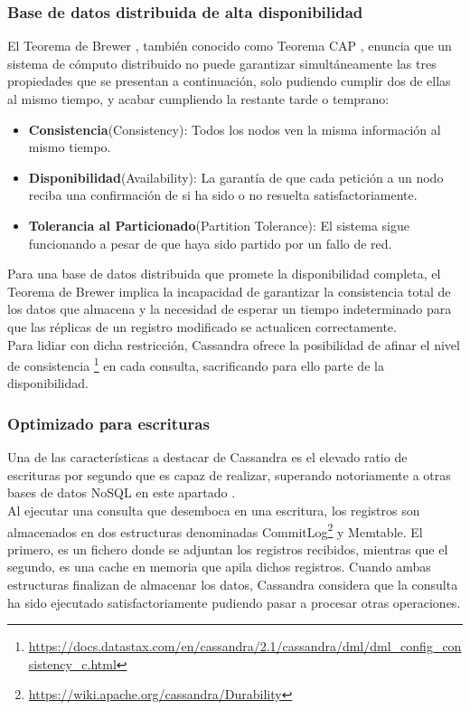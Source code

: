 \subsubsection{Base de datos distribuida de alta disponibilidad}

El Teorema de Brewer \cite{gilbert2002brewer}, también conocido como Teorema CAP , enuncia que un sistema de cómputo distribuido no puede  garantizar simultáneamente las tres propiedades que se presentan a continuación, solo pudiendo cumplir dos de ellas al mismo tiempo, y acabar cumpliendo la restante tarde o temprano:

\begin{itemize}
	\item \textbf{Consistencia}(Consistency): Todos los nodos ven la misma información al mismo tiempo.
	\item \textbf{Disponibilidad}(Availability): La garantía de que cada petición a un nodo reciba una confirmación de si ha sido o no resuelta satisfactoriamente.
	\item \textbf{Tolerancia al Particionado}(Partition Tolerance): El sistema sigue funcionando a pesar de que haya sido partido por un fallo de red.
\end{itemize}

Para una base de datos distribuida que promete la disponibilidad completa, el Teorema de Brewer implica la incapacidad de garantizar la consistencia total de los datos que almacena y la necesidad de esperar un tiempo indeterminado para que las réplicas de un registro modificado se actualicen correctamente.\\

Para lidiar con dicha restricción, Cassandra ofrece la posibilidad de afinar el nivel de consistencia \footnote{\url{https://docs.datastax.com/en/cassandra/2.1/cassandra/dml/dml_config_consistency_c.html}} en cada consulta, sacrificando para ello parte de la disponibilidad.

\subsubsection{Optimizado para escrituras}

Una de las características a destacar de Cassandra es el elevado ratio de escrituras por segundo que es capaz de realizar, superando notoriamente a otras bases de datos NoSQL en este apartado \cite{rabl2012solving}.\\

Al ejecutar una consulta que desemboca en una escritura, los registros son almacenados en dos estructuras denominadas CommitLog\footnote{\url{https://wiki.apache.org/cassandra/Durability}} y Memtable. El primero, es un fichero donde se adjuntan los registros recibidos, mientras que el segundo, es una cache en memoria que apila dichos registros. Cuando ambas estructuras finalizan de almacenar los datos, Cassandra considera que la consulta ha sido ejecutado satisfactoriamente pudiendo pasar a procesar otras operaciones.\\


